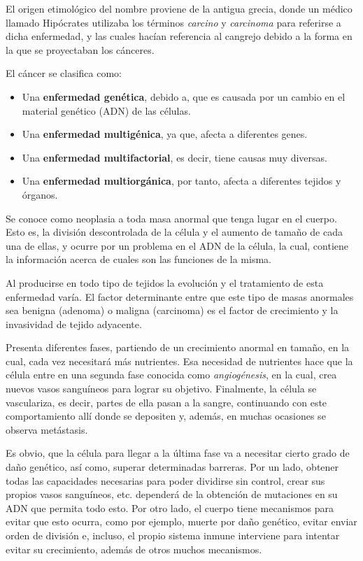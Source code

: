 El origen etimológico del nombre proviene de la antigua grecia, donde un médico llamado
Hipócrates utilizaba los términos \textit{carcino} y \textit{carcinoma} para referirse
a dicha enfermedad, y las cuales hacían referencia al cangrejo debido a la forma en la
que se proyectaban los cánceres.

El cáncer se clasifica como:

\begin{itemize}
    \item Una \textbf{enfermedad genética}, debido a, que es causada por un cambio en el
    material genético (ADN) de las células.
    \item Una \textbf{enfermedad multigénica}, ya que, afecta a diferentes genes.
    \item Una \textbf{enfermedad multifactorial}, es decir, tiene causas muy diversas.
    \item Una \textbf{enfermedad multiorgánica}, por tanto, afecta a diferentes tejidos y órganos.
\end{itemize}

Se conoce como neoplasia a toda masa anormal que tenga lugar en el cuerpo. Esto es, la división
descontrolada de la célula y el aumento de tamaño de cada una de ellas, y ocurre
por un problema en el ADN de la célula, la cual, contiene la información acerca de cuales son
las funciones de la misma.

Al producirse en todo tipo de tejidos la evolución y el tratamiento de esta enfermedad varía.
El factor determinante entre que este tipo de masas anormales sea benigna (adenoma)
o maligna (carcinoma) es el factor de crecimiento y la invasividad de tejido adyacente.

Presenta diferentes fases, partiendo de un crecimiento anormal en tamaño, en la cual,
cada vez necesitará más nutrientes. Esa necesidad de nutrientes hace que la célula entre en
una segunda fase conocida como \textit{angiogénesis}, en la cual, crea nuevos vasos sanguíneos
para lograr su objetivo. Finalmente, la célula se vasculariza, es decir, partes de ella pasan
a la sangre, continuando con este comportamiento allí donde se depositen y, además, en muchas
ocasiones se observa metástasis.

Es obvio, que la célula para llegar a la última fase va a necesitar cierto grado de daño genético,
así como, superar determinadas barreras. Por un lado, obtener todas las capacidades necesarias para
poder dividirse sin control, crear sus propios vasos sanguíneos, etc. dependerá de la obtención
de mutaciones en su ADN que permita todo esto. Por otro lado, el cuerpo tiene mecanismos para evitar
que esto ocurra, como por ejemplo, muerte por daño genético, evitar enviar orden de división e, incluso,
el propio sistema inmune interviene para intentar evitar su crecimiento, además de otros muchos mecanismos.

